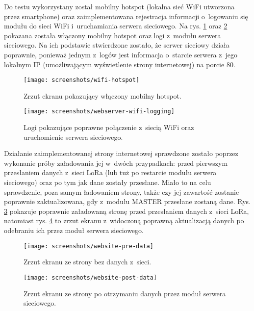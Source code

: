 Do testu wykorzystany został mobilny hotspot (lokalna sieć WiFi utworzona przez smartphone) oraz zaimplementowana
rejestracja informacji o~logowaniu się modułu do sieci WiFi i~uruchamiania serwera sieciowego. Na rys.
\ref{img:wifi-hotspot} oraz \ref{img:webserver-wifi-logging} pokazana została włączony mobilny hotspot oraz logi
z~modułu serwera sieciowego. Na ich podstawie stwierdzone zostało, że serwer sieciowy działa poprawnie, ponieważ jednym
z~logów jest informacja o~starcie serwera z~jego lokalnym IP (umożliwającym wyświetlenie strony internetowej) na porcie
80.

\begin{figure}[!htbp]
    \centering
    \texttt{[image: screenshots/wifi-hotspot]}
    \caption{\label{img:wifi-hotspot}Zrzut ekranu pokazujący włączony mobilny hotspot.}
\end{figure}

\begin{figure}[!htbp]
    \centering
    \texttt{[image: screenshots/webserver-wifi-logging]}
    \caption{\label{img:webserver-wifi-logging}Logi pokazujące poprawne połączenie z~siecią WiFi oraz uruchomienie
        serwera sieciowego.}
\end{figure}

\FloatBarrier
Działanie zaimplementowanej strony internetowej sprawdzone zostało poprzez wykonanie próby załadowania jej w~dwóch
przypadkach: przed pierwszym przesłaniem danych z~sieci LoRa (lub tuż po restarcie modułu serwera sieciowego) oraz po
tym jak dane zostały przesłane. Miało to na celu sprawdzenie, poza samym ładowaniem strony, także czy jej zawartość
zostanie poprawnie zaktualizowana, gdy z~modułu MASTER przesłane zostaną dane. Rys. \ref{img:website-pre-data} pokazuje
poprawnie załadowaną stronę przed przesłaniem danych z~sieci LoRa, natomiast rys. \ref{img:website-post-data} to zrzut
ekranu z~widoczoną poprawną aktualizacją danych po odebraniu ich przez moduł serwera sieciowego.

\begin{figure}[!htbp]
    \centering
    \texttt{[image: screenshots/website-pre-data]}
    \caption{\label{img:website-pre-data}Zrzut ekranu ze strony bez danych z~sieci.}
\end{figure}

\begin{figure}[!htbp]
    \centering
    \texttt{[image: screenshots/website-post-data]}
    \caption{\label{img:website-post-data}Zrzut ekranu ze strony po otrzymaniu danych przez moduł serwera sieciowego.}
\end{figure}
